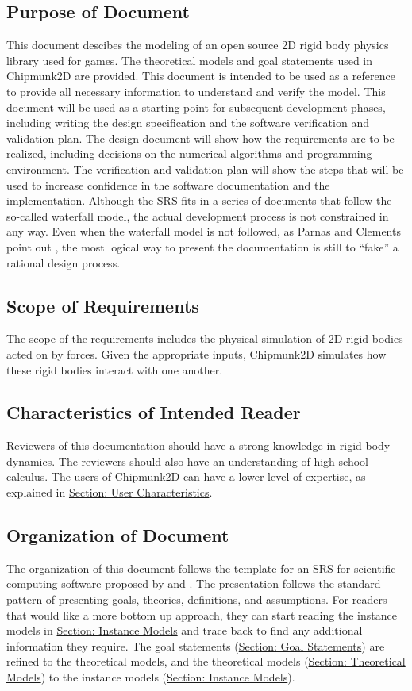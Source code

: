 \documentclass[12pt]{article}
\begin{document}
\subsection{Purpose of Document}
\label{Sec:DocPurpose}
This document descibes the modeling of an open source 2D rigid body physics library used for games. The theoretical models and goal statements used in Chipmunk2D are provided. This document is intended to be used as a reference to provide all necessary information to understand and verify the model.
This document will be used as a starting point for subsequent development phases, including writing the design specification and the software verification and validation plan. The design document will show how the requirements are to be realized, including decisions on the numerical algorithms and programming environment. The verification and validation plan will show the steps that will be used to increase confidence in the software documentation and the implementation. Although the SRS fits in a series of documents that follow the so-called waterfall model, the actual development process is not constrained in any way. Even when the waterfall model is not followed, as Parnas and Clements point out \cite{parnasClements1986}, the most logical way to present the documentation is still to ``fake'' a rational design process.
\subsection{Scope of Requirements}
\label{Sec:ReqsScope}
The scope of the requirements includes the physical simulation of 2D rigid bodies acted on by forces. Given the appropriate inputs, Chipmunk2D simulates how these rigid bodies interact with one another.
\subsection{Characteristics of Intended Reader}
\label{Sec:ReaderChars}
Reviewers of this documentation should have a strong knowledge in rigid body dynamics. The reviewers should also have an understanding of high school calculus. The users of Chipmunk2D can have a lower level of expertise, as explained in \hyperref[Sec:UserChars]{Section: User Characteristics}.
\subsection{Organization of Document}
\label{Sec:DocOrg}
The organization of this document follows the template for an SRS for scientific computing software proposed by \cite{dParnas1972} and \cite{parnasClements1984}. The presentation follows the standard pattern of presenting goals, theories, definitions, and assumptions. For readers that would like a more bottom up approach, they can start reading the instance models in \hyperref[Sec:IMs]{Section: Instance Models} and trace back to find any additional information they require.
The goal statements (\hyperref[Sec:GoalStmt]{Section: Goal Statements}) are refined to the theoretical models, and the theoretical models (\hyperref[Sec:TMs]{Section: Theoretical Models}) to the instance models (\hyperref[Sec:IMs]{Section: Instance Models}).
\end{document}
